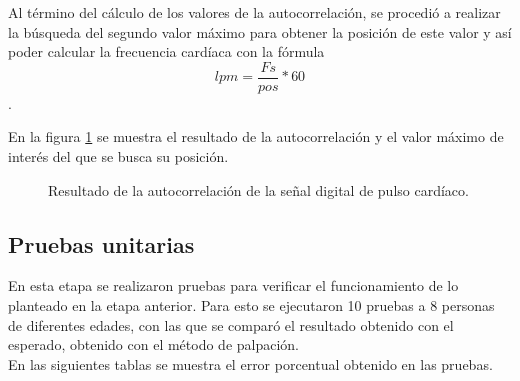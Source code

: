 Al término del cálculo de los valores de la autocorrelación, se procedió a realizar la búsqueda del segundo valor máximo para obtener la posición de este valor y así poder calcular la frecuencia cardíaca con la fórmula $$lpm = \frac{Fs}{pos} * 60$$. 

En la figura \ref{fig:autocorr} se muestra el resultado de la autocorrelación y el valor máximo de interés del que se busca su posición. \\

\begin{figure}[htbp!]
	\centering
	\caption{Resultado de la autocorrelación de la señal digital de pulso cardíaco.}
	\label{fig:autocorr}
\end{figure}

\subsection{Pruebas unitarias}
En esta etapa se realizaron pruebas para verificar el funcionamiento de lo planteado en la etapa anterior. Para esto se ejecutaron 10 pruebas a 8 personas de diferentes edades, con las que se comparó el resultado obtenido con el esperado, obtenido con el método de palpación. \\

En las siguientes tablas se muestra el error porcentual obtenido en las pruebas.

